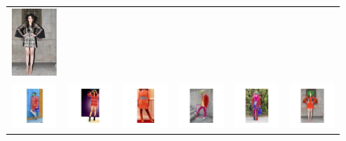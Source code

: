\begin{figure}[H]
\begin{tabular}{cccccc}
		\includegraphics[width=.15\textwidth]{figures/processedimages/original/1103207.jpg}\\
		\includegraphics[width=.15\textwidth ,trim=13cm 5cm 13cm 5cm,clip]{figures/processedimages/28fixedindices/0371919} & 
		\includegraphics[width=.15\textwidth ,trim=13cm 5cm 13cm 5cm,clip]{figures/processedimages/28fixedindices/0811966} &
		\includegraphics[width=.15\textwidth ,trim=13cm 5cm 13cm 5cm,clip]{figures/processedimages/28fixedindices/0895548} &
		\includegraphics[width=.15\textwidth ,trim=13cm 5cm 13cm 5cm,clip]{figures/processedimages/28fixedindices/1069129} &
		\includegraphics[width=.15\textwidth ,trim=13cm 5cm 13cm 5cm,clip]{figures/processedimages/28fixedindices/1088975} & 
		\includegraphics[width=.15\textwidth ,trim=13cm 5cm 13cm 5cm,clip]{figures/processedimages/28fixedindices/1103207}\\

\end{tabular}
\end{figure}
